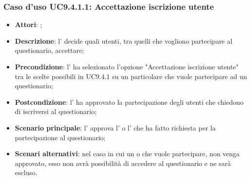 			 \subsubsection{Caso d'uso UC9.4.1.1: Accettazione iscrizione utente}
			 \label{UC9.4.1.1}
			 \begin{itemize}
			 	\item \textbf{Attori}: \uaupro{};
			 	\item \textbf{Descrizione}: l'\uaupro{} decide quali utenti, tra quelli che vogliono partecipare al questionario, accettare; 
			 	\item \textbf{Precondizione}: l'\uaupro{} ha selezionato l'opzione "Accettazione iscrizione utente" tra le scelte possibili in UC9.4.1 su un particolare \uaupro{} che vuole partecipare ad un questionario;
			 	\item \textbf{Postcondizione}: l'\uaupro{} ha approvato la partecipazione degli utenti che chiedono di iscriversi al questionario;
			 	\item \textbf{Scenario principale}: l'\uaupro{} approva l'\uau{} o l'\uaupro{} che ha fatto richiesta per la partecipazione al questionario; 
			 	\item \textbf{Scenari alternativi}: nel caso in cui un \uau{} o \uaupro{} che vuole partecipare, non venga approvato, esso non avrà possibilità di accedere al questionario e ne sarà escluso.
			 \end{itemize}
			
				